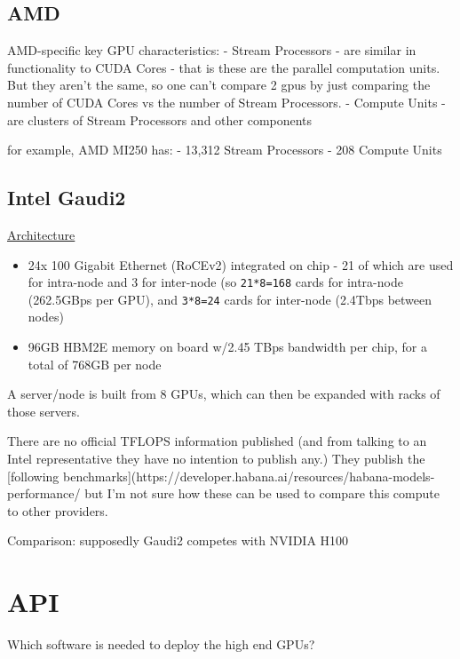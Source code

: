 \documentclass[
]{report}
\providecommand{\tightlist}{%
  \setlength{\itemsep}{0pt}\setlength{\parskip}{0pt}}\usepackage{longtable,booktabs,array}
\begin{document}
\subsection{AMD}\label{amd}

AMD-specific key GPU characteristics: - Stream Processors - are similar
in functionality to CUDA Cores - that is these are the parallel
computation units. But they aren't the same, so one can't compare 2 gpus
by just comparing the number of CUDA Cores vs the number of Stream
Processors. - Compute Units - are clusters of Stream Processors and
other components

for example, AMD MI250 has: - 13,312 Stream Processors - 208 Compute
Units

\subsection{Intel Gaudi2}\label{intel-gaudi2}

\href{https://docs.habana.ai/en/latest/Gaudi_Overview/Gaudi_Architecture.html}{Architecture}

\begin{itemize}
\tightlist
\item
  24x 100 Gigabit Ethernet (RoCEv2) integrated on chip - 21 of which are
  used for intra-node and 3 for inter-node (so \texttt{21*8=168} cards
  for intra-node (262.5GBps per GPU), and \texttt{3*8=24} cards for
  inter-node (2.4Tbps between nodes)
\item
  96GB HBM2E memory on board w/2.45 TBps bandwidth per chip, for a total
  of 768GB per node
\end{itemize}

A server/node is built from 8 GPUs, which can then be expanded with
racks of those servers.

There are no official TFLOPS information published (and from talking to
an Intel representative they have no intention to publish any.) They
publish the {[}following
benchmarks{]}(https://developer.habana.ai/resources/habana-models-performance/
but I'm not sure how these can be used to compare this compute to other
providers.

Comparison: supposedly Gaudi2 competes with NVIDIA H100

\section{API}\label{api}

Which software is needed to deploy the high end GPUs?
\end{document}
